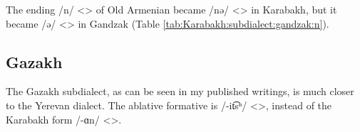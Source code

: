 \begin{table}[H]
	\centering
	\caption{Lack of the sound change from /i/ <> in the Gandzak subdialect of the Karabakh dialect}
	\label{tab:Karabakh:subdialect:gandzak:i}
\end{table}



The ending /n/ <> of Old Armenian became /nə/ <> in Karabakh, but it became /ə/ <> in Gandzak (Table \ref{tab:Karabakh:subdialect:gandzak:n}). 

\begin{table}[H]
	\centering
	\caption{Change from final /(ə)n/ <> in Classical to /ə/ <> in the Gandzak subdialect of the Karabakh dialect}
	\label{tab:Karabakh:subdialect:gandzak:n}
\end{table}



\subsection{Gazakh}

The Gazakh subdialect, as can be seen in my published writings, is much  closer to the Yerevan dialect. The ablative formative is /-it͡sʰ/ <>, instead of the Karabakh form /-ɑn/ <>. 


